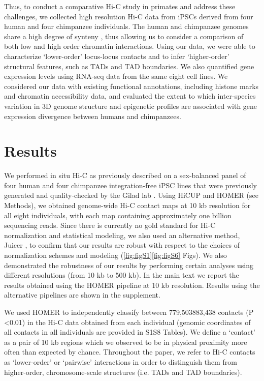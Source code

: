Thus, to conduct a comparative Hi-C study in primates and address these challenges, we collected high resolution Hi-C data from iPSCs derived from four human and four chimpanzee individuals. The human and chimpanzee genomes share a high degree of synteny \cite{Yunis.1982, Yunis.1980, Scally.2012, Kehrer-sawatzki.2007, Catacchio.2018, Lee.2016}, thus allowing us to consider a comparison of both low and high order chromatin interactions. Using our data, we were able to characterize `lower-order' locus-locus contacts and to infer `higher-order' structural features, such as TADs and TAD boundaries. We also quantified gene expression levels using RNA-seq data from the same eight cell lines. We considered our data with existing functional annotations, including histone marks and chromatin accessibility data, and evaluated the extent to which inter-species variation in 3D genome structure and epigenetic profiles are associated with gene expression divergence between humans and chimpanzees.

\section{Results}\label{ch02-results}

We performed in situ Hi-C as previously described \cite{Rao.2014} on a sex-balanced panel of four human and four chimpanzee integration-free iPSC lines that were previously generated and quality-checked by the Gilad lab \cite{Romero.2015}. Using HiCUP \cite{Wingett.2015} and HOMER \cite{Heinz.2010} (see Methods), we obtained genome-wide Hi-C contact maps at 10 kb resolution for all eight individuals, with each map containing approximately one billion sequencing reads. Since there is currently no gold standard for Hi-C normalization and statistical modeling, we also used an alternative method, Juicer \cite{Durand.2016}, to confirm that our results are robust with respect to the choices of normalization schemes and modeling (\ref{fig:figS1}{\textendash}\ref{fig:figS6} Figs). We also demonstrated the robustness of our results by performing certain analyses using different resolutions (from 10 kb to 500 kb). In the main text we report the results obtained using the HOMER pipeline at 10 kb resolution. Results using the alternative pipelines are shown in the supplement.

We used HOMER to independently classify between 779,503{\textendash}883,438 contacts (P \textless 0.01) in the Hi-C data obtained from each individual (genomic coordinates of all contacts in all individuals are provided in S1{\textendash}S8 Tables). We define a `contact' as a pair of 10 kb regions which we observed to be in physical proximity more often than expected by chance. Throughout the paper, we refer to Hi-C contacts as `lower-order' or `pairwise' interactions in order to distinguish them from higher-order, chromosome-scale structures (i.e. TADs and TAD boundaries).

